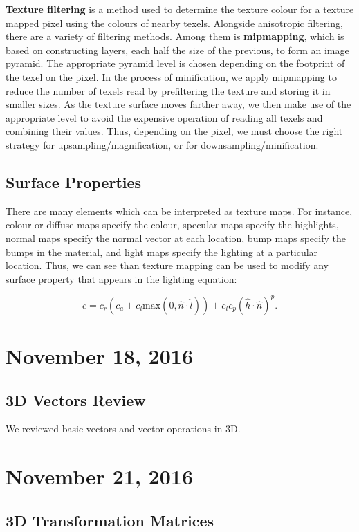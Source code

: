 \documentclass[11pt]{article}
\theoremstyle{plain} %
\theoremstyle{definition}
\theoremstyle{example}
\theoremstyle{remark}
\begin{document}
\textbf{Texture filtering} is a method used to determine the texture colour for a texture mapped pixel using the colours of nearby texels. Alongside anisotropic filtering, there are a variety of filtering methods. Among them is \textbf{mipmapping}, which is based on constructing layers, each half the size of the previous, to form an image pyramid. The appropriate pyramid level is chosen depending on the footprint of the texel on the pixel. In the process of minification, we apply mipmapping to reduce the number of texels read by prefiltering the texture and storing it in smaller sizes. As the texture surface moves farther away, we then make use of the appropriate level to avoid the expensive operation of reading all texels and combining their values. Thus, depending on the pixel, we must choose the right strategy for upsampling/magnification, or for downsampling/minification. 

\subsection{Surface Properties}

There are many elements which can be interpreted as texture maps. For instance, colour or diffuse maps specify the colour, specular maps specify the highlights, normal maps specify the normal vector at each location, bump maps specify the bumps in the material, and light maps specify the lighting at a particular location. Thus, we can see than texture mapping can be used to modify any surface property that appears in the lighting equation:

$$c = c_r\left(c_a + c_l\text{max}\left(0, \hat{n} \cdot \hat{l}\right)\right) + c_lc_p\left(\hat{h} \cdot \hat{n}\right)^p.$$

\section{November 18, 2016}

\subsection{3D Vectors Review}
We reviewed basic vectors and vector operations in 3D.

\section{November 21, 2016}
\subsection{3D Transformation Matrices}
\end{document}
